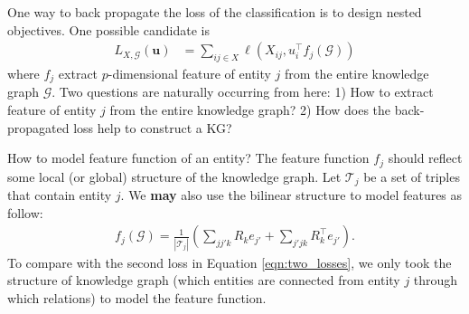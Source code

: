 \documentclass{article} %
\theoremstyle{definition}
\begin{document}
One way to back propagate the loss of the classification is to design nested objectives. One possible candidate is
\begin{align}
L_{X, \mathcal{G}}(\mathbf{u}) & = \sum_{ij \in X}\ell(X_{ij}, u_{i}^\top f_j(\mathcal{G}))
\end{align}
where $f_j$ extract $p$-dimensional feature of entity $j$ from the entire knowledge graph $\mathcal{G}$. Two questions are naturally occurring from here: 1) How to extract feature of entity $j$ from the entire knowledge graph? 2) How does the back-propagated loss help to construct a KG?

How to model feature function of an entity? The feature function $f_j$ should reflect some local (or global) structure of the knowledge graph.  Let $\mathcal{T}_j$ be a set of triples that contain entity $j$. We \textbf{may} also use the bilinear structure to model features as follow:
\begin{align}
f_j(\mathcal{G}) = \frac{1}{|\mathcal{T}_j|} ( \sum_{jj'k} R_k e_{j'} + \sum_{j'jk}R_k^\top e_{j'} ).
\end{align}
To compare with the second loss in Equation \ref{eqn:two_losses}, we only took the structure of knowledge graph (which entities are connected from entity $j$ through which relations) to model the feature function.



\end{document}
